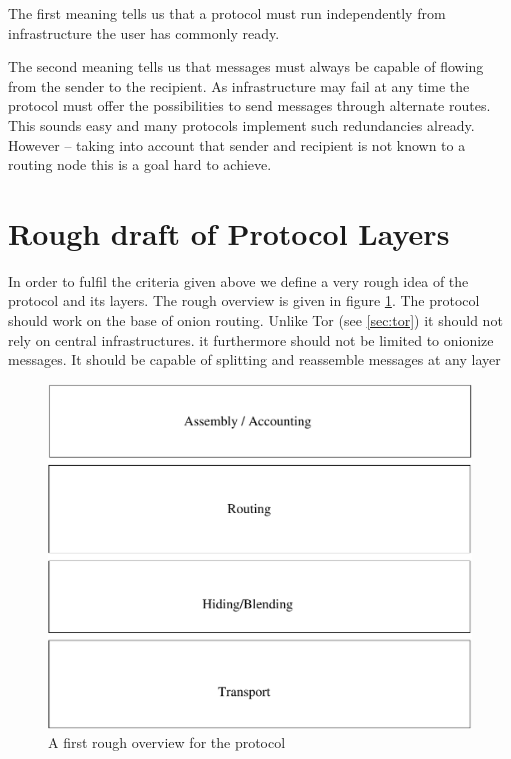 The first meaning tells us that a protocol must run independently from infrastructure the user has commonly ready.

The second meaning tells us that messages must always be capable of flowing from the sender to the recipient. As infrastructure may fail at any time the protocol must offer the possibilities to send messages through alternate routes. This sounds easy and many protocols implement such redundancies already. However -- taking into account that sender and recipient is not known to a routing node this is a goal hard to achieve.

\section{Rough draft of Protocol Layers}
In order to fulfil the criteria given above we define a very rough idea of the protocol and its layers. The rough overview is given in figure \ref{fig:roughProtocolDesign}. The protocol should work on the base of onion routing. Unlike Tor (see \ref{sec:tor}) it should not rely on central infrastructures. it furthermore should not be limited to onionize messages. It should be capable of splitting and reassemble messages at any layer 

\begin{figure}[h]
	\includegraphics[width=\columnwidth]{inc/roughProtocolDesign.pdf}
	\caption{A first rough overview for the protocol}
	\label{fig:roughProtocolDesign}
\end{figure}	

